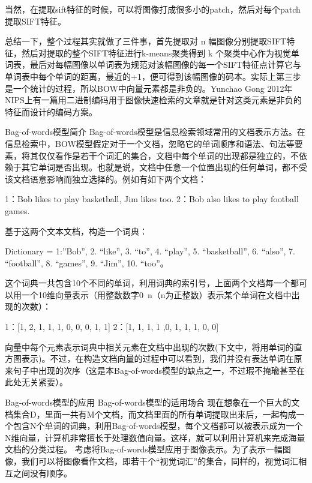 \documentclass[10pt,a4paper]{ctexbook}
\begin{document}
当然，在提取sift特征的时候，可以将图像打成很多小的patch，然后对每个patch提取SIFT特征。

总结一下，整个过程其实就做了三件事，首先提取对 n 幅图像分别提取SIFT特征，然后对提取的整个SIFT特征进行k-means聚类得到 k 个聚类中心作为视觉单词表，最后对每幅图像以单词表为规范对该幅图像的每一个SIFT特征点计算它与单词表中每个单词的距离，最近的+1，便可得到该幅图像的码本。实际上第三步是一个统计的过程，所以BOW中向量元素都是非负的。Yunchao Gong 2012年NIPS上有一篇用二进制编码用于图像快速检索的文章就是针对这类元素是非负的特征而设计的编码方案。






Bag-of-words模型简介
Bag-of-words模型是信息检索领域常用的文档表示方法。在信息检索中，BOW模型假定对于一个文档，忽略它的单词顺序和语法、句法等要素，将其仅仅看作是若干个词汇的集合，文档中每个单词的出现都是独立的，不依赖于其它单词是否出现。也就是说，文档中任意一个位置出现的任何单词，都不受该文档语意影响而独立选择的。例如有如下两个文档：
 
     1：Bob likes to play basketball, Jim likes too.
     2：Bob also likes to play football games.
 
基于这两个文本文档，构造一个词典：
 
Dictionary = {1:”Bob”, 2. “like”, 3. “to”, 4. “play”, 5. “basketball”, 6. “also”, 7. “football”, 8. “games”, 9. “Jim”, 10. “too”}。

这个词典一共包含10个不同的单词，利用词典的索引号，上面两个文档每一个都可以用一个10维向量表示（用整数数字0~n（n为正整数）表示某个单词在文档中出现的次数）：
 
     1：[1, 2, 1, 1, 1, 0, 0, 0, 1, 1]
     2：[1, 1, 1, 1 ,0, 1, 1, 1, 0, 0]
 
向量中每个元素表示词典中相关元素在文档中出现的次数(下文中，将用单词的直方图表示)。不过，在构造文档向量的过程中可以看到，我们并没有表达单词在原来句子中出现的次序（这是本Bag-of-words模型的缺点之一，不过瑕不掩瑜甚至在此处无关紧要）。


Bag-of-words模型的应用
Bag-of-words模型的适用场合
现在想象在一个巨大的文档集合D，里面一共有M个文档，而文档里面的所有单词提取出来后，一起构成一个包含N个单词的词典，利用Bag-of-words模型，每个文档都可以被表示成为一个N维向量，计算机非常擅长于处理数值向量。这样，就可以利用计算机来完成海量文档的分类过程。
考虑将Bag-of-words模型应用于图像表示。为了表示一幅图像，我们可以将图像看作文档，即若干个“视觉词汇”的集合，同样的，视觉词汇相互之间没有顺序。
\end{document}
